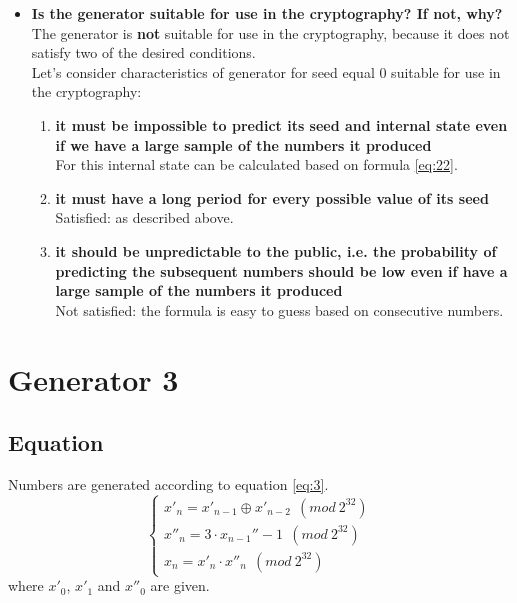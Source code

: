 \documentclass[a4paper,10pt]{article}
\begin{document}
\begin{itemize}
 \item \textbf{Is the generator suitable for use in the cryptography? If not, why?} \\
  The generator is \textbf{not} suitable for use in the cryptography, because it does not satisfy two of the desired conditions.\\
 Let's consider characteristics of generator for seed equal 0 suitable for use in the cryptography:
  \begin{enumerate}
   \item \textbf{it must be impossible to predict its seed and internal state even if we have a large sample of the numbers it produced} \\
   For this internal state can be calculated based on formula \ref{eq:22}.
   \item \textbf{it must have a long period for every possible value of its seed} \\
   Satisfied: as described above.
   \item \textbf{it should be unpredictable to the public, i.e. the probability of predicting the subsequent numbers should be low even if have a large sample of the numbers it produced} \\
   Not satisfied: the formula is easy to guess based on consecutive numbers.
   \end{enumerate}

\end{itemize}


\section{Generator 3}
\subsection{Equation}
Numbers are generated according to equation \ref{eq:3}.
\begin{equation}
\label{eq:3}
\begin{cases}
x'_n = x'_{n-1} \oplus x'_{n-2}\ \ (mod\ 2^{32}) \\ x''_n = 3 \cdot x_{n-1}'' - 1\ \ (mod\ 2^{32}) \\ x_n = x'_n \cdot x''_n\ \ (mod\ 2^{32})
\end{cases}
\end{equation}
where ${x'_0}$, ${x'_1}$ and ${x''_0}$ are given.
\end{document}
